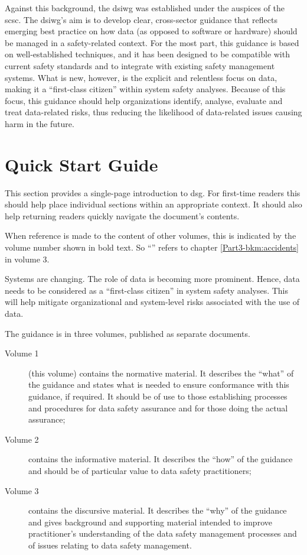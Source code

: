 Against this background, the \gls{dsiwg} was established under the auspices of the \gls{scsc}. The \gls{dsiwg}'s aim is to develop clear, cross-sector guidance that reflects emerging best practice on how data (as opposed to software or hardware) should be managed in a safety-related context.
For the most part, this guidance is based on well-established techniques,
and it has been designed to be compatible with current safety standards and to integrate with existing safety management systems.
What is new, however, is the explicit and relentless focus on data, making it a ``first-class citizen'' within system safety analyses.
Because of this focus, this guidance should help organizations identify, analyse, evaluate and treat data-related risks, thus reducing the likelihood of data-related issues causing harm in the future.

\clearpage
\section*{Quick Start Guide}
\pagestyle{ContinuationPageFrontMatter}


This section provides a single-page introduction to \gls{dsg}. For first-time readers this should help place individual sections within an appropriate context. It should also help returning readers quickly navigate the document's contents.

When reference is made to the content of other volumes, this is indicated by the volume number shown in bold text. So ``'' refers to chapter \ref*{Part3-bkm:accidents} in volume 3.


Systems are changing. The role of data is becoming more prominent. Hence, data needs to be considered as a ``first-class citizen'' in system safety analyses. This will help mitigate organizational and system-level risks associated with the use of data.

The guidance is in three volumes, published as separate documents.
\begin{description}
	\item[Volume 1] (this volume) contains the normative material. It describes the ``what'' of the guidance and states what is needed to ensure conformance with this guidance, if required. It should be of use to those establishing processes and procedures for data safety assurance and for those doing the actual assurance;
	\item[Volume 2] contains the informative material. It describes the ``how'' of the guidance and should be of particular value to data safety practitioners;
	\item[Volume 3] contains the discursive material. It describes the ``why'' of the guidance and gives background and supporting material intended to improve practitioner's understanding of the data safety management processes and of issues relating to data safety management.
\end{description}
	
